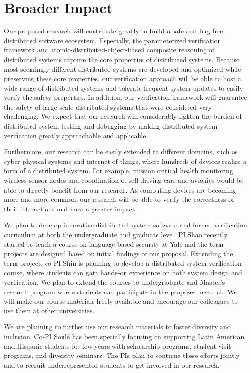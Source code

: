 \documentclass[11pt]{article}
\begin{document}
\section{Broader Impact}

Our proposed research will contribute greatly to build a safe and
bug-free distributed software ecosystem. Especially, the parameterized
verification framework and atomic-distributed-object-based composite
reasoning of distributed systems capture the core properties of
distributed systems. Because most seemingly different distributed
systems are developed and optimized while preserving these core
properties, our verification approach will be able to host a wide
range of distributed systems and tolerate frequent system updates to
easily verify the safety properties. In addition, our verification
framework will guarantee the safety of large-scale distributed systems
that were considered very challenging. We expect that our research
will considerably lighten the burden of distributed system testing and
debugging by making distributed system verification greatly
approachable and applicable.

Furthermore, our research can be easily extended to different domains,
such as cyber physical systems and internet of things, where hundreds
of devices realize a form of a distributed system. For example,
mission critical health monitoring wireless sensor nodes and
coordination of self-driving cars and avionics would be able to
directly benefit from our research. As computing devices are becoming
more and more common, our research will be able to verify the
correctness of their interactions and have a greater impact.

We plan to develop innovative distributed system software and formal
verification curriculum at both the undergraduate and graduate
level. PI Shao recently started to teach a course on language-based
security at Yale and the term projects are designed based on initial
findings of our proposal.  Extending the term project, co-PI Shin is
planning to develop a distributed system verification course, where
students can gain hands-on experience on both system design and
verification. We plan to extend the courses to undergraduate and
Master's research program where students can participate in the
proposed research. We will make our course materials freely available
and encourage our colleagues to use them at other universities.

We are planning to further use our research materials to foster
diversity and inclusion. Co-PI Soul\'e has been specially focusing
on supporting Latin American and Hispanic students for few years with
scholarship programs, student visit programs, and diversity seminars. 
The PIs plan to continue these efforts jointly and to recruit 
underrepresented students to get involved in our research.
\end{document}
